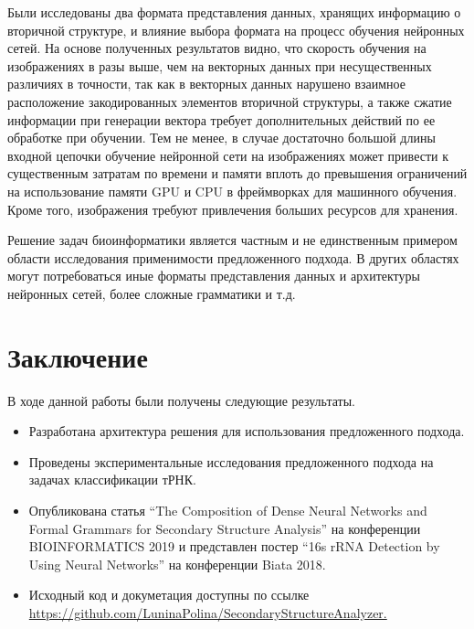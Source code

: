 Были исследованы два формата представления данных, хранящих информацию о вторичной структуре, и влияние выбора формата на процесс обучения нейронных сетей. На основе полученных результатов видно, что скорость обучения на изображениях в разы выше, чем на векторных данных при несущественных различиях в точности, так как в векторных данных нарушено взаимное расположение закодированных элементов вторичной структуры, а также сжатие информации при генерации вектора требует дополнительных действий по ее обработке при обучении. Тем не менее, в случае достаточно большой длины входной цепочки обучение нейронной сети на изображениях может привести к существенным затратам по времени и памяти вплоть до превышения ограничений на использование памяти GPU и CPU в фреймворках для машинного обучения. Кроме того, изображения требуют привлечения больших ресурсов для хранения.

Решение задач биоинформатики является частным и не единственным примером области исследования применимости предложенного подхода. В других областях могут потребоваться иные форматы представления данных и архитектуры нейронных сетей, более сложные грамматики и т.д.


\section*{Заключение}
В ходе данной работы были получены следующие результаты.
\begin{itemize}
    \item Разработана архитектура решения для использования предложенного подхода.
    \item Проведены экспериментальные исследования предложенного подхода на задачах классификации тРНК.
    \item Опубликована статья ``The Composition of Dense Neural Networks and Formal Grammars for Secondary Structure Analysis'' на конференции BIOINFORMATICS 2019 и представлен постер ``16s rRNA Detection by Using Neural Networks'' на конференции Biata 2018.
    \item Исходный код и докуметация доступны по ссылке \url{https://github.com/LuninaPolina/SecondaryStructureAnalyzer.}
\end{itemize}


